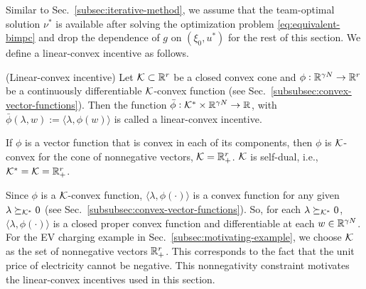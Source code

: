 Similar to Sec.~\ref{subsec:iterative-method}, we assume that the team-optimal solution $\nu^*$ is available after solving the optimization problem \eqref{eq:equivalent-bimpc} and drop the dependence of $g$ on $(\xi_0, u^*)$ for the rest of this section.
We define a linear-convex incentive as follows.
\begin{definition}(Linear-convex incentive)
\label{def:linear-convex-incentive}
    Let $\mathcal{K} \subset \mathbb{R}^r$ be a closed convex cone and $\phi: \mathbb{R}^{\gamma N} \rightarrow \mathbb{R}^r$ be a continuously differentiable $\mathcal{K}$-convex function (see Sec.~\ref{subsubsec:convex-vector-functions}).
    Then the function $\bar{\phi}: \mathcal{K}^* \times \mathbb{R}^{\gamma N} \rightarrow \mathbb{R}$, with $\bar{\phi}(\lambda, w) := \langle \lambda, \phi(w) \rangle$ is called a linear-convex incentive.
\end{definition}

\begin{remark}
\label{rem:linear-convex-incentive-componentwise}
    If $\phi$ is a vector function that is convex in each of its components, then $\phi$ is $\mathcal{K}$-convex for the cone of nonnegative vectors, $\mathcal{K} = \mathbb{R}^{r}_+$.
    $\mathcal{K}$ is self-dual, i.e., $\mathcal{K}^* = \mathcal{K} = \mathbb{R}^{r}_+$.
\end{remark}

Since $\phi$ is a $\mathcal{K}$-convex function, $\langle \lambda, \phi(\cdot) \rangle$ is a convex function for any given $\lambda \succeq_{\mathcal{K}^*} 0$ (see Sec.~\ref{subsubsec:convex-vector-functions}).
So, for each $\lambda \succeq_{\mathcal{K}^*} 0$, $\langle \lambda, \phi(\cdot) \rangle$ is a closed proper convex function and differentiable at each $w \in \mathbb{R}^{\gamma N}$.
For the EV charging example in Sec.~\ref{subsec:motivating-example}, we choose $\mathcal{K}$ as the set of nonnegative vectors $\mathbb{R}^{r}_+$.
This corresponds to the fact that the unit price of electricity cannot be negative.
This nonnegativity constraint motivates the linear-convex incentives used in this section.

